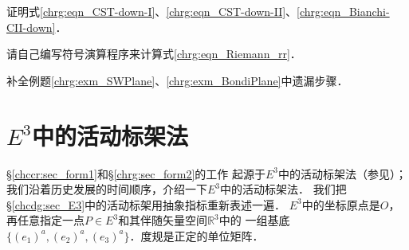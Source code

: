 \begin{exercise}
	证明式\eqref{chrg:eqn_CST-down-I}、\eqref{chrg:eqn_CST-down-II}、\eqref{chrg:eqn_Bianchi-CII-down}．
\end{exercise}

\begin{exercise}
	请自己编写符号演算程序来计算式\eqref{chrg:eqn_Riemann_rr}．
\end{exercise}

\begin{exercise}
	补全例题\ref{chrg:exm_SWPlane}、\ref{chrg:exm_BondiPlane}中遗漏步骤．
\end{exercise}




\section{$E^3$中的活动标架法}\label{chrg:sec_E3MF}
\S \ref{chccr:sec_form1}和\S\ref{chrg:sec_form2}的工作
起源于$E^3$中的活动标架法（参见\parencite[\S 6.3]{cc2001-zh}）；
我们沿着历史发展的时间顺序，介绍一下$E^3$中的活动标架法．
我们把\S\ref{chcdg:sec_E3}中的活动标架用抽象指标重新表述一遍．
$E^3$中的坐标原点是$O$，再任意指定一点$P\in E^3$和其伴随矢量空间$\mathbb{R}^3$中的
一组基底$\{(e_1)^a,(e_2)^a,(e_3)^a\}$．度规是正定的单位矩阵．

